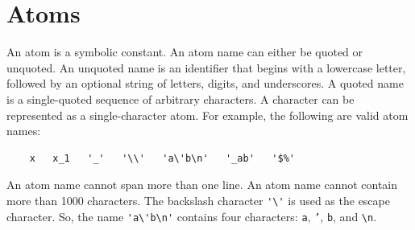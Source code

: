 \section{Atoms}
An atom is a symbolic constant. An atom name can either be quoted or unquoted. An unquoted name is an identifier that begins with a lowercase letter, followed by an optional string of letters, digits, and underscores. A quoted name is a single-quoted sequence of arbitrary characters. A character can be represented as a single-character atom. For example, the following are valid atom names:
\begin{verbatim}
    x   x_1   '_'   '\\'   'a\'b\n'   '_ab'   '$%'
\end{verbatim}
An atom name cannot span more than one line.   An atom name cannot contain more than 1000 characters. The backslash character \verb+'\'+ is used as the escape character. So, the name \verb+'a\'b\n'+ contains four characters: \texttt{a}, \texttt{'}, \texttt{b}, and \verb+\n+.

